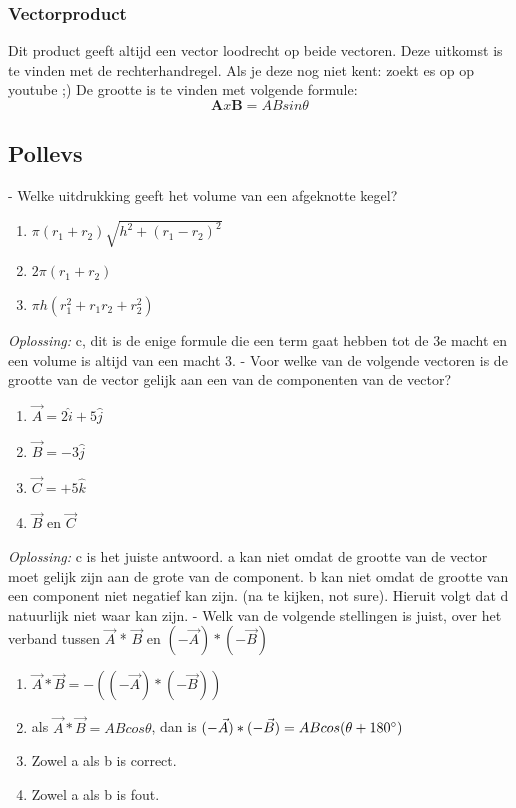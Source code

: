 \documentclass[12pt,a4paper]{article}
\begin{document}
	\subsubsection{Vectorproduct}
	Dit product geeft altijd een vector loodrecht op beide vectoren. Deze uitkomst is te vinden met de rechterhandregel. Als je deze nog niet kent: zoekt es op op youtube ;) 
	De grootte is te vinden met volgende formule: 
	\[\textbf{A} x \textbf{B} = ABsin\theta\]
	
	\subsection{Pollevs}
	- Welke uitdrukking geeft het volume van een afgeknotte kegel?
	\begin{enumerate} [label=\alph*)]
		\item \(\pi(r_1 + r_2)\sqrt{h^2 + (r_1 - r_2)^2}\)
		\item \(2\pi(r_1 + r_2)\)
		\item \(\pi h(r_1^2 + r_1r_2 + r_2^2)\)
	\end{enumerate}
	\textit{Oplossing:} c, dit is de enige formule die een term gaat hebben tot de 3e macht en een volume is altijd van een macht 3. 
	\newline
	- Voor welke van de volgende vectoren is de grootte van de vector gelijk aan een van de componenten van de vector? 
	\begin{enumerate}[label = \alph*)]
		\item \(\vec{A} = 2\hat{i} + 5\hat{j}\)
		\item \(\vec{B} = -3\hat{j}\)
		\item \(\vec{C} = +5\hat{k}\)
		\item \(\vec{B} \text{ en } \vec{C}\)
	\end{enumerate}
	\textit{Oplossing:} c is het juiste antwoord. a kan niet omdat de grootte van de vector moet gelijk zijn aan de grote van de component. b kan niet omdat de grootte van een component niet negatief kan zijn. (na te kijken, not sure). Hieruit volgt dat d natuurlijk niet waar kan zijn. 
	\newline
	- Welk van de volgende stellingen is juist, over het verband tussen $\vec{A}$ * $\vec{B}$ en \((-\vec{A}) * (-\vec{B})\)
	\begin{enumerate}[label=\alph*)]
		\item \(\vec{A} * \vec{B} = -((-\vec{A})*(-\vec{B}))\)
		\item als \(\vec{A} * \vec{B} = ABcos\theta \), dan is \((-\vec{A}) * (-\vec{B}) = ABcos(\theta + 180\degree)\)
		\item Zowel a als b is correct. 
		\item Zowel a als b is fout. 
	\end{enumerate}
\end{document}
